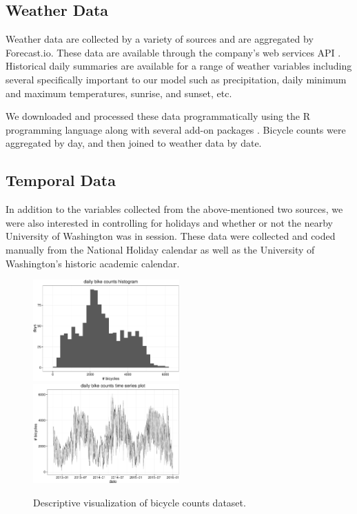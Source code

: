 \documentclass [11pt, proquest] {uwthesis}[2015/03/03]
\begin{document}
\subsection{Weather Data}
Weather data are collected by a variety of sources and are aggregated by Forecast.io. These data are available through the company's web services API \cite{The-Dark-Sky-Company:aa}. Historical daily summaries are available for a range of weather variables including several specifically important to our model such as precipitation, daily minimum and maximum temperatures, sunrise, and sunset, etc.

We downloaded and processed these data programmatically using the R programming language along with several add-on packages \cite{Grolemund:2011aa,Wickham:2011aa,Couture-Beil:2014aa,Lang:2014aa,R-Core-Team:2014aa}. Bicycle counts were aggregated by day, and then joined to weather data by date. 

\subsection{Temporal Data}
In addition to the variables collected from the above-mentioned two sources, we were also interested in controlling for holidays and whether or not the nearby University of Washington was in session. These data were collected and coded manually from the National Holiday calendar as well as the University of Washington's historic academic calendar.

\begin{figure}
  \centering
    \includegraphics[width=0.5\textwidth]{figures/daily_hist} \hfill
    \includegraphics[width=0.5\textwidth]{figures/daily_tscount_plot}
  \caption{Descriptive visualization of bicycle counts dataset.}
  \label{fg:descriptives}
\end{figure}
\end{document}
